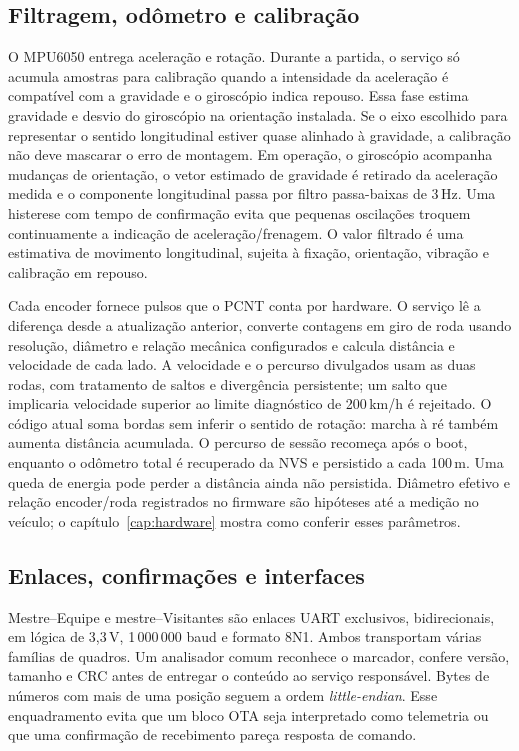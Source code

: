 \subsection{Filtragem, odômetro e calibração}
O MPU6050 entrega aceleração e rotação. Durante a partida, o serviço só acumula amostras para calibração quando a intensidade da aceleração é compatível com a gravidade e o giroscópio indica repouso. Essa fase estima gravidade e desvio do giroscópio na orientação instalada. Se o eixo escolhido para representar o sentido longitudinal estiver quase alinhado à gravidade, a calibração não deve mascarar o erro de montagem. Em operação, o giroscópio acompanha mudanças de orientação, o vetor estimado de gravidade é retirado da aceleração medida e o componente longitudinal passa por filtro passa-baixas de 3\,Hz. Uma histerese com tempo de confirmação evita que pequenas oscilações troquem continuamente a indicação de aceleração/frenagem. O valor filtrado é uma estimativa de movimento longitudinal, sujeita à fixação, orientação, vibração e calibração em repouso.

Cada encoder fornece pulsos que o PCNT conta por hardware. O serviço lê a diferença desde a atualização anterior, converte contagens em giro de roda usando resolução, diâmetro e relação mecânica configurados e calcula distância e velocidade de cada lado. A velocidade e o percurso divulgados usam as duas rodas, com tratamento de saltos e divergência persistente; um salto que implicaria velocidade superior ao limite diagnóstico de 200\,km/h é rejeitado. O código atual soma bordas sem inferir o sentido de rotação: marcha à ré também aumenta distância acumulada. O percurso de sessão recomeça após o boot, enquanto o odômetro total é recuperado da NVS e persistido a cada 100\,m. Uma queda de energia pode perder a distância ainda não persistida. Diâmetro efetivo e relação encoder/roda registrados no firmware são hipóteses até a medição no veículo; o capítulo~\ref{cap:hardware} mostra como conferir esses parâmetros.

\subsection{Enlaces, confirmações e interfaces}
Mestre--Equipe e mestre--Visitantes são enlaces UART exclusivos, bidirecionais, em lógica de 3,3\,V, 1\,000\,000 baud e formato 8N1. Ambos transportam várias famílias de quadros. Um analisador comum reconhece o marcador, confere versão, tamanho e CRC antes de entregar o conteúdo ao serviço responsável. Bytes de números com mais de uma posição seguem a ordem \emph{little-endian}. Esse enquadramento evita que um bloco OTA seja interpretado como telemetria ou que uma confirmação de recebimento pareça resposta de comando.

